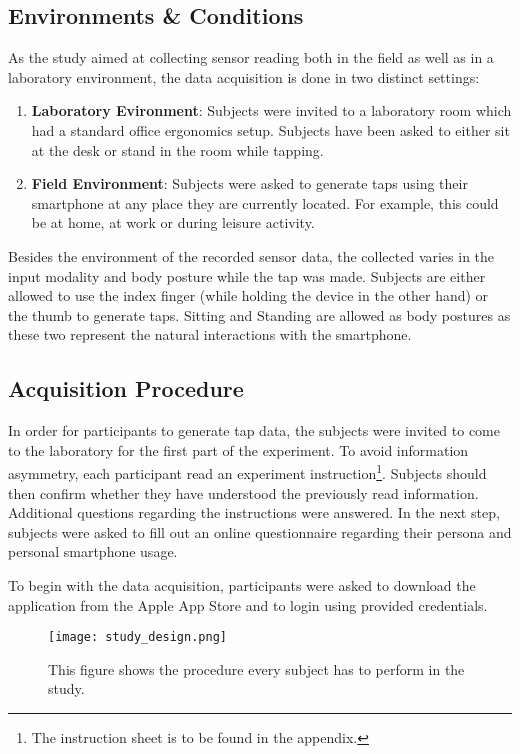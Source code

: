 \subsection{Environments \& Conditions}
As the study aimed at collecting sensor reading both in the field as well as in a laboratory environment, the data acquisition is done in two distinct settings:
\begin{enumerate}
  \item \textbf{Laboratory Evironment}: Subjects were invited to a laboratory room which had a standard office ergonomics setup. Subjects have been asked to either sit at the desk or stand in the room while tapping.
  \item \textbf{Field Environment}: Subjects were asked to generate taps using their smartphone at any place they are currently located. For example, this could be at home, at work or during leisure activity.
\end{enumerate}

Besides the environment of the recorded sensor data, the collected varies in the input modality and body posture while the tap was made. Subjects are either allowed to use the index finger (while holding the device in the other hand) or the thumb to generate taps. Sitting and Standing are allowed as body postures as these two represent the natural interactions with the smartphone. 

\subsection{Acquisition Procedure}
In order for participants to generate tap data, the subjects were invited to come to the laboratory for the first part of the experiment. To avoid information asymmetry, each participant read an experiment instruction\footnote{The instruction sheet is to be found in the appendix.}. Subjects should then confirm whether they have understood the previously read information. Additional questions regarding the instructions were answered. In the next step, subjects were asked to fill out an online questionnaire regarding their persona and personal smartphone usage.

To begin with the data acquisition, participants were asked to download the application from the Apple App Store and to login using provided credentials.

\begin{figure}[h!]
  \centering
  \texttt{[image: study\_design.png]}
  \caption{This figure shows the procedure every subject has to perform in the study.} \label{fig:study_design}
\end{figure}

